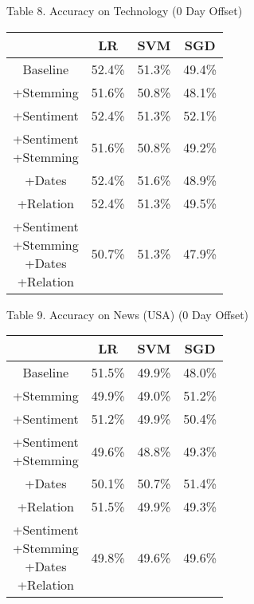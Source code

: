 \documentclass[11pt,a4paper]{article}
\begin{document}
\begin{center}
Table 8. Accuracy on Technology (0 Day Offset)
\begin{tabular}{ |c|c|c|c| }
 \hline
  & LR & SVM & SGD \\
  \hline
  Baseline & 52.4\% & 51.3\% & 49.4\% \\
  \hline
 +Stemming & 51.6\% & 50.8\% & 48.1\% \\
  \hline
 +Sentiment & 52.4\% & 51.3\%  & 52.1\% \\
  \hline
  \shortstack{+Sentiment \\ +Stemming} & 51.6\% & 50.8\% & 49.2\%\\
 \hline
 +Dates & 52.4\% & 51.6\% & 48.9\% \\
  \hline
 +Relation & 52.4\% & 51.3\% & 49.5\% \\
  \hline
  \shortstack{+Sentiment \\ +Stemming \\+Dates \\+Relation} & 50.7\% & 51.3\% & 47.9\% \\
 \hline
\end{tabular}
\end{center}


\begin{center}
Table 9. Accuracy on News (USA) (0 Day Offset)
\begin{tabular}{ |c|c|c|c| }
 \hline
  & LR & SVM & SGD \\
  \hline
  Baseline & 51.5\% & 49.9\% & 48.0\% \\
  \hline
 +Stemming & 49.9\% & 49.0\% & 51.2\% \\
  \hline
 +Sentiment & 51.2\% & 49.9\%  & 50.4\% \\
  \hline
  \shortstack{+Sentiment \\ +Stemming} & 49.6\% & 48.8\% & 49.3\%\\
 \hline
 +Dates & 50.1\% & 50.7\% & 51.4\% \\
  \hline
 +Relation & 51.5\% & 49.9\% & 49.3\% \\
  \hline
  \shortstack{+Sentiment \\ +Stemming \\+Dates \\+Relation} & 49.8\% & 49.6\% & 49.6\% \\
 \hline
\end{tabular}
\end{center}
\end{document}
